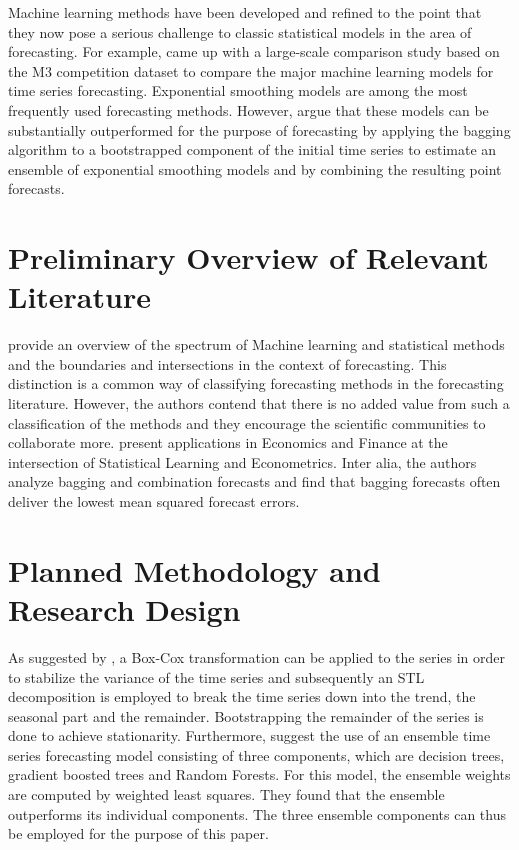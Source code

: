 Machine learning methods have been developed and refined to the point that they now pose a serious challenge to classic statistical models in the area of forecasting. For example, \citeauthor*{ahmed} \parencite*{ahmed} came up with a large-scale comparison study based on the M3 competition dataset to compare the major machine learning models for time series forecasting. Exponential smoothing models are among the most frequently used forecasting methods. However, \textcite{bergmeir} argue that these models can be substantially outperformed for the purpose of forecasting by applying the bagging algorithm to a bootstrapped component of the initial time series to estimate an ensemble of exponential smoothing models and by combining the resulting point forecasts. 

\section{Preliminary Overview of Relevant Literature}

\citeauthor*{januschowski2020} \parencite*{januschowski2020} provide an overview of the spectrum of Machine learning and statistical methods and the boundaries and intersections in the context of forecasting. This distinction is a common way of classifying forecasting methods in the forecasting literature. However, the authors contend that there is no added value from such a classification of the methods and they encourage the scientific communities to collaborate more.
\textcite{maasoumi2010} present applications in Economics and Finance at the intersection of Statistical Learning and Econometrics. Inter alia, the authors analyze bagging and combination forecasts and find that bagging forecasts often deliver the lowest mean squared forecast errors.

\section{Planned Methodology and Research Design}

As suggested by \textcite{bergmeir}, a Box-Cox transformation can be applied to the series in order to stabilize the variance of the time series and subsequently an STL decomposition is employed to break the time series down into the trend, the seasonal part and the remainder. Bootstrapping the remainder of the series is done to achieve stationarity. Furthermore, \citeauthor*{galicia2019} \parencite*{galicia2019} suggest the use of an ensemble time series forecasting model consisting of three components, which are decision trees, gradient boosted trees and Random Forests. For this model, the ensemble weights are computed by weighted least squares. They found that the ensemble outperforms its individual components. The three ensemble components can thus be employed for the purpose of this paper.

